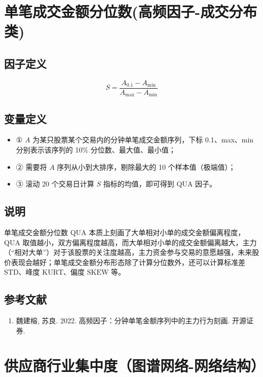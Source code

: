 \documentclass{article}
\begin{document}
\section{单笔成交金额分位数(高频因子-成交分布类)}

\subsection{因子定义}
\begin{equation}
    S = \frac{A_{0.1} - A_{\min}}{A_{\max} - A_{\min}}
\end{equation}

\subsection{变量定义}
\begin{itemize}
    \item ① \(A\) 为某只股票某个交易内的分钟单笔成交金额序列，下标 0.1、max、min 分别表示该序列的 10\% 分位数、最大值、最小值；
    \item ② 需要将 \(A\) 序列从小到大排序，剔除最大的 10 个样本值（极端值）；
    \item ③ 滚动 20 个交易日计算 \(S\) 指标的均值，即可得到 \(\mathrm{QUA}\) 因子。
\end{itemize}

\subsection{说明}
单笔成交金额分位数 \(\mathrm{QUA}\) 本质上刻画了大单相对小单的成交金额偏离程度，\(\mathrm{QUA}\) 取值越小，双方偏离程度越高，而大单相对小单的成交金额偏离越大，主力（“相对大单”）对于该股票的关注度越高，主力资金参与交易的意愿越强，未来股价表现会越好；单笔成交金额分布形态除了计算分位数外，还可以计算标准差 \(\mathrm{STD}\)、峰度 \(\mathrm{KURT}\)、偏度 \(\mathrm{SKEW}\) 等。

\subsection{参考文献}
\begin{enumerate}
    \item 魏建榕, 苏良. 2022. 高频因子：分钟单笔金额序列中的主力行为刻画. 开源证券.
\end{enumerate}

\section{供应商行业集中度（图谱网络-网络结构）}
\end{document}
